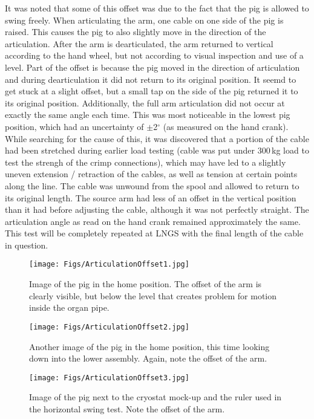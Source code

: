 \begin{itemize}
 It was noted that some of this offset was due to the fact that the pig is allowed to swing freely. When articulating the arm, one cable on one side of the pig is raised. This causes the pig to also slightly move in the direction of the articulation. After the
arm is dearticulated, the arm returned to vertical according to the hand wheel, but not according to visual
inspection and use of a level. Part of the offset is because the pig moved in the direction of articulation and
during dearticulation it did not return to its original position. It seemd to get stuck at a slight offset, but a
small tap on the side of the pig returned it to its original position. Additionally, the full arm articulation did
not occur at exactly the same angle each time. This was most noticeable in the lowest pig position, which
had an uncertainty of $\pm$2$^{\circ}$ (as measured on the hand crank). While searching for the cause of
this, it was discovered that a portion of the cable had been stretched during earlier load testing (cable was put under 300\,kg load to test the strengh of the crimp connections), which may have
led to a slightly uneven extension / retraction of the cables, as well as tension at certain points along the
line. The cable was unwound from the spool and allowed to return to its original length.
 The source arm had less of an offset in the vertical position than it had before adjusting the cable, although it was not perfectly straight. The articulation angle as read on the hand crank remained approximately the
same. This test will be completely repeated at LNGS with the final length of the cable in question.

\begin{figure}[htbp]
 \centering
 \texttt{[image: Figs/ArticulationOffset1.jpg]}
 \caption{Image of the pig in the home position. The offset of the arm is clearly visible, but below the level that creates problem for motion inside the organ pipe.}
 \label{fig:art_offset1}
\end{figure}

\begin{figure}[htbp]
 \centering
 \texttt{[image: Figs/ArticulationOffset2.jpg]}
 \caption{Another image of the pig in the home position, this time looking down into the lower assembly. Again, note the offset of the arm.}
 \label{fig:art_offset2}
\end{figure}

\begin{figure}[htbp]
 \centering
 \texttt{[image: Figs/ArticulationOffset3.jpg]}
 \caption{Image of the pig next to the cryostat mock-up and the ruler used in the horizontal swing test. Note the offset of the arm.}
 \label{fig:art_offset3}
\end{figure}


\end{itemize}
